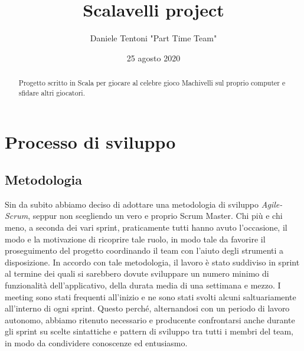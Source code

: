 \documentclass{article}
\title{Scalavelli project}
\date{25 agosto 2020}
\author{Daniele Tentoni "Part Time Team"}
\begin{document}
    \maketitle
    \newpage

    \begin{abstract}
        Progetto scritto in Scala per giocare al celebre gioco Machivelli sul proprio computer e sfidare altri giocatori.
    \end{abstract}

    \tableofcontents

    \newpage


    \section{Processo di sviluppo}

    \subsection{Metodologia}

    Sin da subito abbiamo deciso di adottare una metodologia di sviluppo \textit{Agile-Scrum}, seppur non scegliendo un
    vero e proprio Scrum Master. Chi più e chi meno, a seconda dei vari sprint, praticamente tutti hanno avuto
    l'occasione, il modo e la motivazione di ricoprire tale ruolo, in modo tale da favorire il proseguimento del
    progetto coordinando il team con l'aiuto degli strumenti a disposizione. %
    In accordo con tale metodologia, il lavoro è stato suddiviso in sprint al termine dei quali si sarebbero dovute
    sviluppare un numero minimo di funzionalità dell'applicativo, della durata media di una settimana e mezzo. I meeting
    sono stati frequenti all'inizio e ne sono stati svolti alcuni saltuariamente all'interno di ogni sprint. Questo
    perché, alternandosi con un periodo di lavoro autonomo, abbiamo ritenuto necessario e producente confrontarsi anche
    durante gli sprint su scelte sintattiche e pattern di sviluppo tra tutti i membri del team, in modo da condividere
    conoscenze ed entusiasmo.
\end{document}
